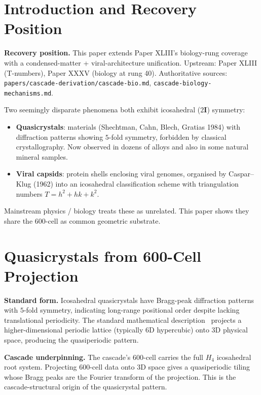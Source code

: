 \documentclass[12pt]{article}
\theoremstyle{remark}
\newcommand{\twoI}{2\mathbf{I}}
\begin{document}
\section{Introduction and Recovery Position}\label{sec:intro}

\textbf{Recovery position.} This paper extends Paper XLIII's biology-rung coverage with a condensed-matter + viral-architecture unification. Upstream: Paper XLIII (T-numbers), Paper XXXV (biology at rung 40). Authoritative sources: \texttt{papers/cascade-derivation/cascade-bio.md}, \texttt{cascade-biology-mechanisms.md}.

Two seemingly disparate phenomena both exhibit icosahedral ($\twoI$) symmetry:

\begin{itemize}
\item \textbf{Quasicrystals}: materials (Shechtman, Cahn, Blech, Gratias 1984) with diffraction patterns showing $5$-fold symmetry, forbidden by classical crystallography. Now observed in dozens of alloys and also in some natural mineral samples.
\item \textbf{Viral capsids}: protein shells enclosing viral genomes, organised by Caspar--Klug (1962) into an icosahedral classification scheme with triangulation numbers $T = h^2 + hk + k^2$.
\end{itemize}

Mainstream physics / biology treats these as unrelated. This paper shows they share the 600-cell as common geometric substrate.

\section{Quasicrystals from 600-Cell Projection}\label{sec:quasi}

\textbf{Standard form.} Icosahedral quasicrystals have Bragg-peak diffraction patterns with $5$-fold symmetry, indicating long-range positional order despite lacking translational periodicity. The standard mathematical description~\citep{ElserSteinhardt1985} projects a higher-dimensional periodic lattice (typically 6D hypercubic) onto 3D physical space, producing the quasiperiodic pattern.

\textbf{Cascade underpinning.} The cascade's 600-cell carries the full $H_4$ icosahedral root system. Projecting 600-cell data onto 3D space gives a quasiperiodic tiling whose Bragg peaks are the Fourier transform of the projection. This is the cascade-structural origin of the quasicrystal pattern.
\end{document}
